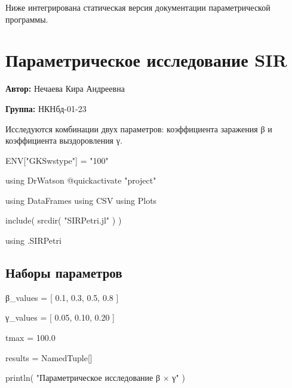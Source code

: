 \documentclass[
  english,
  russian,
  12pt,
  a4paper,
  DIV=11,
  numbers=noendperiod]{scrreprt}
\newenvironment{Shaded}{\begin{snugshade}}{\end{snugshade}}
\newcommand{\BuiltInTok}[1]{\textcolor[rgb]{0.00,0.23,0.31}{#1}}
\newcommand{\ConstantTok}[1]{\textcolor[rgb]{0.56,0.35,0.01}{#1}}
\newcommand{\DataTypeTok}[1]{\textcolor[rgb]{0.68,0.00,0.00}{#1}}
\newcommand{\FloatTok}[1]{\textcolor[rgb]{0.68,0.00,0.00}{#1}}
\newcommand{\FunctionTok}[1]{\textcolor[rgb]{0.28,0.35,0.67}{#1}}
\newcommand{\ImportTok}[1]{\textcolor[rgb]{0.00,0.46,0.62}{#1}}
\newcommand{\NormalTok}[1]{\textcolor[rgb]{0.00,0.23,0.31}{#1}}
\newcommand{\OperatorTok}[1]{\textcolor[rgb]{0.37,0.37,0.37}{#1}}
\newcommand{\PreprocessorTok}[1]{\textcolor[rgb]{0.68,0.00,0.00}{#1}}
\newcommand{\StringTok}[1]{\textcolor[rgb]{0.13,0.47,0.30}{#1}}
\begin{document}
Ниже интегрирована статическая версия документации параметрической
программы.

\chapter{Параметрическое исследование
SIR}\label{ux43fux430ux440ux430ux43cux435ux442ux440ux438ux447ux435ux441ux43aux43eux435-ux438ux441ux441ux43bux435ux434ux43eux432ux430ux43dux438ux435-sir}

\textbf{Автор:} Нечаева Кира Андреевна

\textbf{Группа:} НКНбд-01-23

Исследуются комбинации двух параметров: коэффициента заражения β и
коэффициента выздоровления γ.

\begin{Shaded}
\begin{Highlighting}[]
\ConstantTok{ENV}\NormalTok{[}\StringTok{"GKSwstype"}\NormalTok{] }\OperatorTok{=} \StringTok{"100"}

\ImportTok{using} \BuiltInTok{DrWatson}
\PreprocessorTok{@quickactivate} \StringTok{"project"}

\ImportTok{using} \BuiltInTok{DataFrames}
\ImportTok{using} \BuiltInTok{CSV}
\ImportTok{using} \BuiltInTok{Plots}

\FunctionTok{include}\NormalTok{(}
    \FunctionTok{srcdir}\NormalTok{(}
        \StringTok{"SIRPetri.jl"}
\NormalTok{    )}
\NormalTok{)}

\ImportTok{using} \BuiltInTok{.SIRPetri}
\end{Highlighting}
\end{Shaded}

\section{Наборы
параметров}\label{ux43dux430ux431ux43eux440ux44b-ux43fux430ux440ux430ux43cux435ux442ux440ux43eux432}

\begin{Shaded}
\begin{Highlighting}[]
\NormalTok{β\_values }\OperatorTok{=}
\NormalTok{    [}
        \FloatTok{0.1}\NormalTok{,}
        \FloatTok{0.3}\NormalTok{,}
        \FloatTok{0.5}\NormalTok{,}
        \FloatTok{0.8}
\NormalTok{    ]}

\NormalTok{γ\_values }\OperatorTok{=}
\NormalTok{    [}
        \FloatTok{0.05}\NormalTok{,}
        \FloatTok{0.10}\NormalTok{,}
        \FloatTok{0.20}
\NormalTok{    ]}

\NormalTok{tmax }\OperatorTok{=}
    \FloatTok{100.0}

\NormalTok{results }\OperatorTok{=}
    \DataTypeTok{NamedTuple}\NormalTok{[]}

\FunctionTok{println}\NormalTok{(}
    \StringTok{"Параметрическое исследование β × γ"}
\NormalTok{)}
\end{Highlighting}
\end{Shaded}
\end{document}
